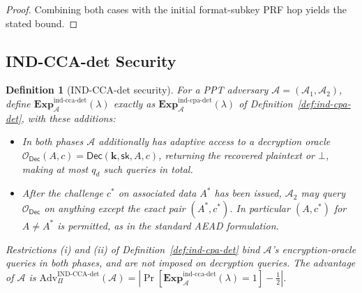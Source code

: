 \documentclass[11pt,a4paper]{article}
\newtheorem{definition}[theorem]{Definition}
\begin{document}
\begin{proof}
Combining both cases with the initial format-subkey PRF hop yields the
stated bound.
\end{proof}

\subsection{IND-CCA-det Security}
\label{sec:ind-cca}

\begin{definition}[IND-CCA-det security]\label{def:ind-cca-det}
For a PPT adversary $\mathcal{A}=(\mathcal{A}_1,\mathcal{A}_2)$, define
$\mathbf{Exp}^{\mathrm{ind\text{-}cca\text{-}det}}_{\mathcal{A}}(\lambda)$
exactly as
$\mathbf{Exp}^{\mathrm{ind\text{-}cpa\text{-}det}}_{\mathcal{A}}(\lambda)$
of Definition~\ref{def:ind-cpa-det}, with these additions:
\begin{itemize}
  \item In both phases $\mathcal{A}$ additionally has adaptive access to a
        decryption oracle
        $\mathcal{O}_{\mathsf{Dec}}(A,c)=\mathsf{Dec}(\mathbf{k},\mathsf{sk},A,c)$,
        returning the recovered plaintext or $\bot$, making at most $q_d$
        such queries in total.
  \item After the challenge $c^*$ on associated data $A^*$ has been issued,
        $\mathcal{A}_2$ may query $\mathcal{O}_{\mathsf{Dec}}$ on anything
        except the exact pair $(A^*,c^*)$. In particular $(A,c^*)$ for
        $A\neq A^*$ is permitted, as in the standard AEAD formulation.
\end{itemize}
Restrictions (i) and (ii) of Definition~\ref{def:ind-cpa-det} bind
$\mathcal{A}$'s \emph{encryption}-oracle queries in both phases, and are
not imposed on decryption queries. The advantage of $\mathcal{A}$ is
$\mathrm{Adv}^{\mathrm{IND\text{-}CCA\text{-}det}}_{\Pi}(\mathcal{A}) =
|\Pr[\mathbf{Exp}^{\mathrm{ind\text{-}cca\text{-}det}}_{\mathcal{A}}(\lambda)=1]-\tfrac12|$.
\end{definition}
\end{document}
